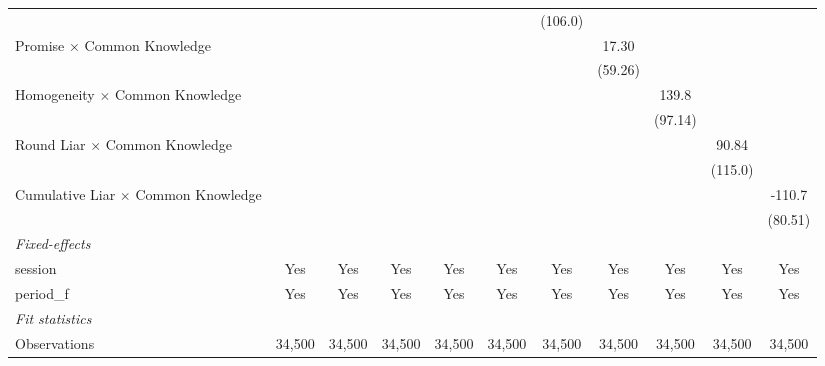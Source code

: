 \begin{tabular}{lcccccccccc}
                                              &          &             &              &          &               & (106.0)  &          &               &          &   \\   
   Promise $\times$ Common Knowledge          &          &             &              &          &               &          & 17.30    &               &          &   \\   
                                              &          &             &              &          &               &          & (59.26)  &               &          &   \\   
   Homogeneity $\times$ Common Knowledge      &          &             &              &          &               &          &          & 139.8         &          &   \\   
                                              &          &             &              &          &               &          &          & (97.14)       &          &   \\   
   Round Liar $\times$ Common Knowledge       &          &             &              &          &               &          &          &               & 90.84    &   \\   
                                              &          &             &              &          &               &          &          &               & (115.0)  &   \\   
   Cumulative Liar $\times$ Common Knowledge  &          &             &              &          &               &          &          &               &          & -110.7\\   
                                              &          &             &              &          &               &          &          &               &          & (80.51)\\   
   \midrule
   \emph{Fixed-effects}\\
   session                                    & Yes      & Yes         & Yes          & Yes      & Yes           & Yes      & Yes      & Yes           & Yes      & Yes\\  
   period\_f                                  & Yes      & Yes         & Yes          & Yes      & Yes           & Yes      & Yes      & Yes           & Yes      & Yes\\  
   \midrule
   \emph{Fit statistics}\\
   Observations                               & 34,500   & 34,500      & 34,500       & 34,500   & 34,500        & 34,500   & 34,500   & 34,500        & 34,500   & 34,500\\  

\end{tabular}
